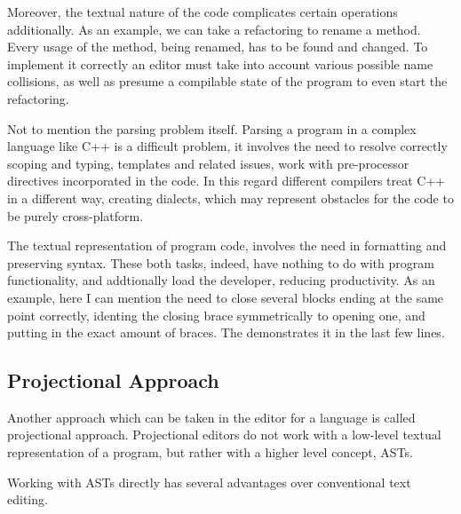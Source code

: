 Moreover, the textual nature of the code complicates certain operations additionally. As an example, we can take a refactoring
to rename a method. Every usage of the method, being renamed, has to be found and changed. To implement it correctly an editor
must take into account various possible name collisions, as well as presume a compilable state of the program to even start
the refactoring.

Not to mention the parsing problem itself. Parsing a program in a complex language like C++ is a difficult problem, it involves 
the need to resolve correctly scoping and typing, templates and related issues, work with pre-processor directives incorporated
in the code. In this regard different compilers treat C++ in a different way, creating dialects, which may represent obstacles for
the code to be purely cross-platform.


The textual representation of program code, involves the need in formatting and preserving syntax. These both tasks, indeed,  
have nothing to do with program functionality, and addtionally load the developer, reducing productivity. As an example, here
I can mention the need to close several blocks ending at the same point correctly, identing the closing brace symmetrically 
to opening one, and putting in the exact amount of braces. The  demonstrates it in the last few lines.

\subsection{Projectional Approach}

Another approach which can be taken in the editor for a language is called projectional approach. Projectional editors
do not work with a low-level textual representation of a program, but rather with a higher level concept, ASTs.

Working with ASTs directly has several advantages over conventional text editing.


